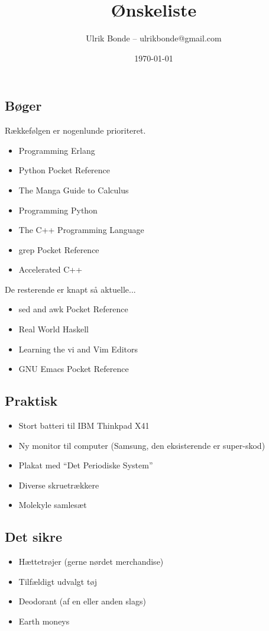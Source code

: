 \documentclass[a4paper, danish, 10pt, final]{article}
\title{Ønskeliste}
\author{Ulrik Bonde -- ulrikbonde@gmail.com}
\date{\today}
\begin{document}
\maketitle
\subsection*{Bøger}
Rækkefølgen er nogenlunde prioriteret.
\begin{itemize}
    \item Programming Erlang \citep{armstrong2007pe}
    \item Python Pocket Reference \citep{lutz2009python}
    \item The Manga Guide to Calculus \citep{kojima2009calc}
    \item Programming Python \citep{lutz2011progpython}
    \item The C++ Programming Language \citep{stroustrup200002}
    \item grep Pocket Reference \citep{bambenekKlus200901}
    \item Accelerated C++ \citep{koenigMoo200008}
\end{itemize}
De resterende er knapt så aktuelle...
\begin{itemize}
    \item sed and awk Pocket Reference \citep{robbins200206}
    \item Real World Haskell \citep{osullivanGoerzenStewart200812}
    \item Learning the vi and Vim Editors \citep{robbinsHannahLamb200807}
    \item GNU Emacs Pocket Reference \citep{cameron199811}
\end{itemize}

\subsection*{Praktisk}
\begin{itemize}
    \item Stort batteri til IBM Thinkpad X41
    \item Ny monitor til computer (Samsung, den eksisterende er super-skod)
    \item Plakat med ``Det Periodiske System''
    \item Diverse skruetrækkere
    \item Molekyle samlesæt
\end{itemize}

\subsection*{Det sikre}
\begin{itemize}
    \item Hættetrøjer (gerne nørdet merchandise)
    \item Tilfældigt udvalgt tøj
    \item Deodorant (af en eller anden slags)
    \item Earth moneys
\end{itemize}



\end{document}
